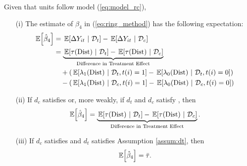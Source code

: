 \begin{proposition}\label{prop:ring_decomp_rc}  
  Given that units follow model (\ref{eq:model_rc}),
  \begin{enumerate}
    \item[(i)] The estimate of $\beta_4$ in (\ref{eq:ring_method}) has the following expectation:
    \begin{align*}
      \expec{\hat{\beta}_4} &= \expec{\Delta Y_{it}}{\mathcal{D}_t} - \expec{\Delta Y_{it}}{\mathcal{D}_c} \\
      &=  \underbrace{\expec{\tau(\dist)}{\mathcal{D}_t} - \expec{\tau(\dist)}{\mathcal{D}_c} }_{\text{Difference in Treatment Effect}} \\
      &\quad + ( \expec{\lambda_1(\dist)}{\mathcal{D}_t, t(i) = 1} - \expec{\lambda_0(\dist)}{\mathcal{D}_t, t(i) = 0} ) \\
      &\quad - ( \expec{\lambda_1(\dist)}{\mathcal{D}_c, t(i) = 1} - \expec{\lambda_0(\dist)}{\mathcal{D}_c, t(i) = 0} )   \\
    \end{align*}
    
    \item[(ii)] If $d_c$ satisfies  or, more weakly, if $d_t$ and $d_c$ satisfy , then
    \[ 
      \expec{\hat{\beta}_4} = 
      \underbrace{\expec{\tau(\dist)}{\mathcal{D}_t} - \expec{\tau(\dist)}{\mathcal{D}_c} }_{\text{Difference in Treatment Effect}}.
    \] 
  
    \item[(iii)] If $d_c$ satisfies  and $d_t$ satisfies Assumption \ref{assum:dt}, then
    \[ 
      \expec{\hat{\beta}_4} = \bar{\tau}.
    \]
  \end{enumerate}
\end{proposition}


